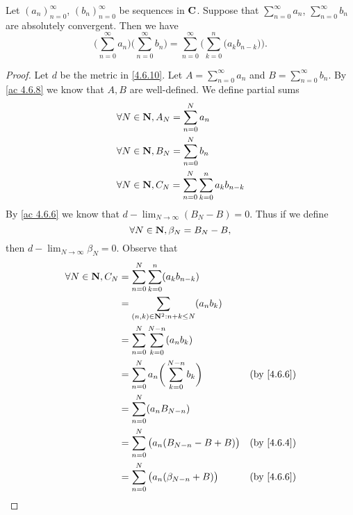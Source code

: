 \begin{additional corollary}\label{ac 4.6.9}
Let \((a_n)_{n = 0}^\infty\), \((b_n)_{n = 0}^\infty\) be sequences in \(\mathbf{C}\).
Suppose that \(\sum_{n = 0}^\infty a_n\), \(\sum_{n = 0}^\infty b_n\) are absolutely convergent.
Then we have
\[
  \bigg(\sum_{n = 0}^\infty a_n\bigg) \bigg(\sum_{n = 0}^\infty b_n\bigg) = \sum_{n = 0}^\infty \bigg(\sum_{k = 0}^n \big(a_k b_{n - k}\big)\bigg).
\]
\end{additional corollary}

\begin{proof}
  Let \(d\) be the metric in \cref{4.6.10}.
  Let \(A = \sum_{n = 0}^\infty a_n\) and \(B = \sum_{n = 0}^\infty b_n\).
  By \cref{ac 4.6.8} we know that \(A, B\) are well-defined.
  We define partial sums
  \begin{align*}
     & \forall N \in \mathbf{N}, A_N = \sum_{n = 0}^N a_n                          \\
     & \forall N \in \mathbf{N}, B_N = \sum_{n = 0}^N b_n                          \\
     & \forall N \in \mathbf{N}, C_N = \sum_{n = 0}^N \sum_{k = 0}^n a_k b_{n - k}
  \end{align*}
  By \cref{ac 4.6.6} we know that \(d - \lim_{N \to \infty} (B_N - B) = 0\).
  Thus if we define
  \[
    \forall N \in \mathbf{N}, \beta_N = B_N - B,
  \]
  then \(d - \lim_{N \to \infty} \beta_N = 0\).
  Observe that
  \begin{align*}
    \forall N \in \N, C_N & = \sum_{n = 0}^N \sum_{k = 0}^n (a_k b_{n - k})                                                    \\
                          & = \sum_{(n, k) \in \N^2 : n + k \leq N} (a_n b_k)                                                  \\
                          & = \sum_{n = 0}^N \sum_{k = 0}^{N - n} (a_n b_k)                                                    \\
                          & = \sum_{n = 0}^N a_n \bigg(\sum_{k = 0}^{N - n} b_k\bigg)               & \text{(by \cref{4.6.6})} \\
                          & = \sum_{n = 0}^N (a_n B_{N - n})                                                                   \\
                          & = \sum_{n = 0}^N \big(a_n (B_{N - n} - B + B)\big)                      & \text{(by \cref{4.6.4})} \\
                          & = \sum_{n = 0}^N \big(a_n (\beta_{N - n} + B)\big)                      & \text{(by \cref{4.6.6})} \\

\end{align*}
\end{proof}
